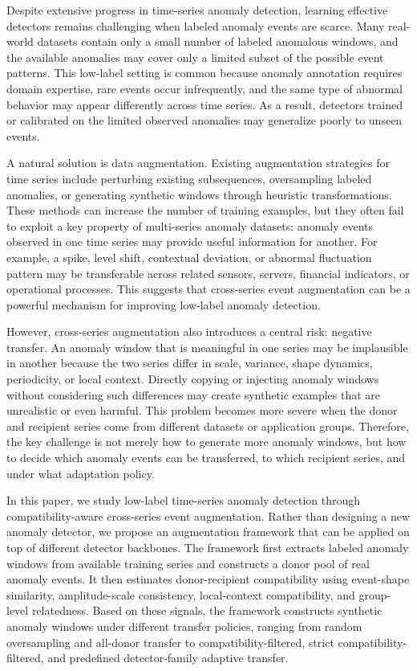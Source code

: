 \documentclass[conference]{IEEEtran}
\begin{document}
Despite extensive progress in time-series anomaly detection, learning effective detectors remains challenging when labeled anomaly events are scarce. Many real-world datasets contain only a small number of labeled anomalous windows, and the available anomalies may cover only a limited subset of the possible event patterns. This low-label setting is common because anomaly annotation requires domain expertise, rare events occur infrequently, and the same type of abnormal behavior may appear differently across time series. As a result, detectors trained or calibrated on the limited observed anomalies may generalize poorly to unseen events.

A natural solution is data augmentation. Existing augmentation strategies for time series include perturbing existing subsequences, oversampling labeled anomalies, or generating synthetic windows through heuristic transformations. These methods can increase the number of training examples, but they often fail to exploit a key property of multi-series anomaly datasets: anomaly events observed in one time series may provide useful information for another. For example, a spike, level shift, contextual deviation, or abnormal fluctuation pattern may be transferable across related sensors, servers, financial indicators, or operational processes. This suggests that cross-series event augmentation can be a powerful mechanism for improving low-label anomaly detection.

However, cross-series augmentation also introduces a central risk: negative transfer. An anomaly window that is meaningful in one series may be implausible in another because the two series differ in scale, variance, shape dynamics, periodicity, or local context. Directly copying or injecting anomaly windows without considering such differences may create synthetic examples that are unrealistic or even harmful. This problem becomes more severe when the donor and recipient series come from different datasets or application groups. Therefore, the key challenge is not merely how to generate more anomaly windows, but how to decide which anomaly events can be transferred, to which recipient series, and under what adaptation policy.

In this paper, we study low-label time-series anomaly detection through compatibility-aware cross-series event augmentation. Rather than designing a new anomaly detector, we propose an augmentation framework that can be applied on top of different detector backbones. The framework first extracts labeled anomaly windows from available training series and constructs a donor pool of real anomaly events. It then estimates donor-recipient compatibility using event-shape similarity, amplitude-scale consistency, local-context compatibility, and group-level relatedness. Based on these signals, the framework constructs synthetic anomaly windows under different transfer policies, ranging from random oversampling and all-donor transfer to compatibility-filtered, strict compatibility-filtered, and predefined detector-family adaptive transfer.
\end{document}
